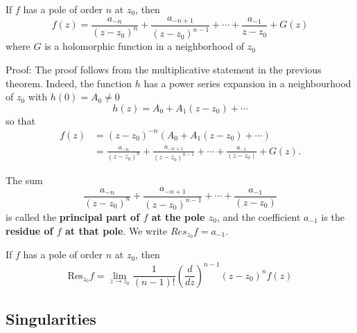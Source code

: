 \documentclass[12pt, oneside]{book}
\begin{document}
\begin{theorem}
    If $f$ has a pole of order $n$ at $z_0$, then
    $$f(z)=\frac{a_{-n}}{(z-z_0)^n}+\frac{a_{-n+1}}{(z-z_0)^{n-1}}+\cdots+\frac{a_{-1}}{z-z_0}+G(z)$$
    where $G$ is a holomorphic function in a neighborhood of $z_0$

    Proof: The proof follows from the multiplicative statement in the previous theorem. Indeed, the function $h$ has a power series expansion in a neighbourhood of $z_0$ with $h(0)=A_0\neq 0$
    $$h(z)=A_0+A_1(z-z_0)+\cdots $$
    so that
    $$\begin{aligned}f(z)&=(z-z_0)^{-n}(A_0+A_1(z-z_0)+\cdots)\\&=\frac{a_{-n}}{(z-z_0)^n}+\frac{a_{-n+1}}{(z-z_0)^{n-1}}+\cdots+\frac{a_{-1}}{(z-z_0)}+G(z).\end{aligned}$$

    The sum
    $$\frac{a_{-n}}{(z-z_0)^n}+\frac{a_{-n+1}}{(z-z_0)^{n-1}}+\cdots+\frac{a_{-1}}{(z-z_0)}$$
    is called the \textbf{principal part of $f$ at the pole $z_0$}, and the coefficient $a_{-1}$ is the \textbf{residue of $f$ at that pole}. We write $Res_{z_0}f=a_{-1}$.
\end{theorem}

\begin{theorem}
    If $f$ has a pole of order $n$ at $z_0$, then
    $$
        \mathrm{Res}_{z_0}f =\lim_{z\to z_0}\frac{1}{(n-1)!}\left(\frac{d}{dz}\right)^{n-1}(z-z_0)^nf(z)
    $$
\end{theorem}

\subsection{Singularities}
\end{document}
